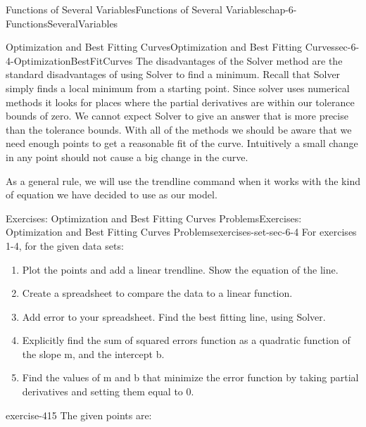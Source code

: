 \documentclass[oneside,10pt,]{book}
\numberwithin{equation}{section}
\begin{document}
\begin{chapterptx}{Functions of Several Variables}{}{Functions of Several Variables}{}{}{chap-6-FunctionsSeveralVariables}
\begin{sectionptx}{Optimization and Best Fitting Curves}{}{Optimization and Best Fitting Curves}{}{}{sec-6-4-OptimizationBestFitCurves}
\hypertarget{p-2475}{}%
The disadvantages of the Solver method are the standard disadvantages of using Solver to find a minimum.  Recall that Solver simply finds a local minimum from a starting point.  Since solver uses numerical methods it looks for places where the partial derivatives are within our tolerance bounds of zero.  We cannot expect Solver to give an answer that is more precise than the tolerance bounds. With all of the methods we should be aware that we need enough points to get a reasonable fit of the curve.  Intuitively a small change in any point should not cause a big change in the curve.%
\par
\hypertarget{p-2476}{}%
As a general rule, we will use the trendline command when it works with the kind of equation we have decided to use as our model.%
%
%
\typeout{************************************************}
\typeout{************************************************}
%
\begin{exercises-subsection-numberless}{Exercises: Optimization and Best Fitting Curves Problems}{}{Exercises: Optimization and Best Fitting Curves Problems}{}{}{exercises-set-sec-6-4}
\hypertarget{p-2477}{}%
For exercises 1-4, for the given data sets:%
\leavevmode%
\begin{enumerate}[label=(\arabic*)]
\item\hypertarget{li-676}{}\hypertarget{p-2478}{}%
Plot the points and add a linear trendline.  Show the equation of the line.%
\item\hypertarget{li-677}{}\hypertarget{p-2479}{}%
Create a spreadsheet to compare the data to a linear function.%
\item\hypertarget{li-678}{}\hypertarget{p-2480}{}%
Add error to your spreadsheet.  Find the best fitting line, using Solver.%
\item\hypertarget{li-679}{}\hypertarget{p-2481}{}%
Explicitly find the sum of squared errors function as a quadratic function of the slope m, and the intercept b.%
\item\hypertarget{li-680}{}\hypertarget{p-2482}{}%
Find the values of m and b that minimize the error function by taking partial derivatives and setting them equal to 0.%
\end{enumerate}
\begin{divisionexercise}{1}{}{}{exercise-415}%
\hypertarget{p-2483}{}%
The given points are:%
\begin{sidebyside}{1}{0}{0}{0}%
\begin{sbspanel}{1}%

\end{sbspanel}
\end{sidebyside}
\end{divisionexercise}
\end{exercises-subsection-numberless}
\end{sectionptx}
\end{chapterptx}
\end{document}
